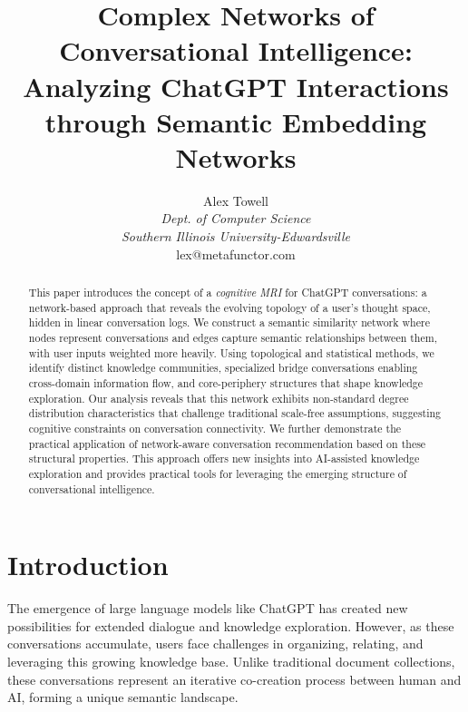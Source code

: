 \documentclass[10pt, a4paper]{article}
\begin{document}
\title{Complex Networks of Conversational Intelligence: Analyzing ChatGPT Interactions through Semantic Embedding Networks}

\author{Alex Towell\\
\textit{Dept. of Computer Science}\\
\textit{Southern Illinois University-Edwardsville}\\
lex@metafunctor.com
}

\maketitle


\begin{abstract}
This paper introduces the concept of a \emph{cognitive MRI} for ChatGPT conversations: a network-based approach that reveals the evolving topology of a user's thought space, hidden in linear conversation logs. We construct a semantic similarity network where nodes represent conversations and edges capture semantic relationships between them, with user inputs weighted more heavily. Using topological and statistical methods, we identify distinct knowledge communities, specialized bridge conversations enabling cross-domain information flow, and core-periphery structures that shape knowledge exploration. Our analysis reveals that this network exhibits non-standard degree distribution characteristics that challenge traditional scale-free assumptions, suggesting cognitive constraints on conversation connectivity. We further demonstrate the practical application of network-aware conversation recommendation based on these structural properties. This approach offers new insights into AI-assisted knowledge exploration and provides practical tools for leveraging the emerging structure of conversational intelligence.
\end{abstract}

\section{Introduction}

The emergence of large language models like ChatGPT has created new possibilities for extended dialogue and knowledge exploration. However, as these conversations accumulate, users face challenges in organizing, relating, and leveraging this growing knowledge base. Unlike traditional document collections, these conversations represent an iterative co-creation process between human and AI, forming a unique semantic landscape.
\end{document}
